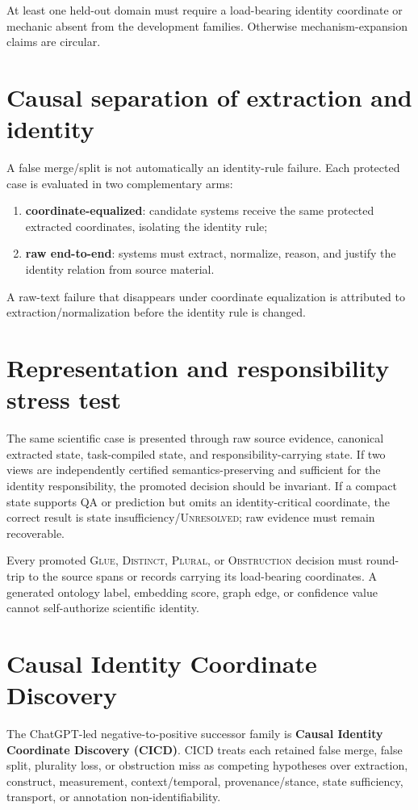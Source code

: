 \documentclass[11pt]{article}
\begin{document}
At least one held-out domain must require a load-bearing identity coordinate or mechanic absent from the development families. Otherwise mechanism-expansion claims are circular.

\section{Causal separation of extraction and identity}
A false merge/split is not automatically an identity-rule failure. Each protected case is evaluated in two complementary arms:
\begin{enumerate}
    \item \textbf{coordinate-equalized}: candidate systems receive the same protected extracted coordinates, isolating the identity rule;
    \item \textbf{raw end-to-end}: systems must extract, normalize, reason, and justify the identity relation from source material.
\end{enumerate}
A raw-text failure that disappears under coordinate equalization is attributed to extraction/normalization before the identity rule is changed.

\section{Representation and responsibility stress test}
The same scientific case is presented through raw source evidence, canonical extracted state, task-compiled state, and responsibility-carrying state. If two views are independently certified semantics-preserving and sufficient for the identity responsibility, the promoted decision should be invariant. If a compact state supports QA or prediction but omits an identity-critical coordinate, the correct result is state insufficiency/\textsc{Unresolved}; raw evidence must remain recoverable.

Every promoted \textsc{Glue}, \textsc{Distinct}, \textsc{Plural}, or \textsc{Obstruction} decision must round-trip to the source spans or records carrying its load-bearing coordinates. A generated ontology label, embedding score, graph edge, or confidence value cannot self-authorize scientific identity.

\section{Causal Identity Coordinate Discovery}
The ChatGPT-led negative-to-positive successor family is \textbf{Causal Identity Coordinate Discovery (CICD)}. CICD treats each retained false merge, false split, plurality loss, or obstruction miss as competing hypotheses over extraction, construct, measurement, context/temporal, provenance/stance, state sufficiency, transport, or annotation non-identifiability.
\end{document}
